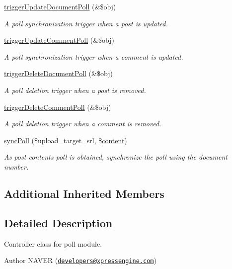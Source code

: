 \begin{DoxyCompactItemize}
\hyperlink{classpollController_a20c5267c985ebf4484a61b238850f0c5}{trigger\+Update\+Document\+Poll} (\&\$obj)
\begin{DoxyCompactList}\small\item\em A poll synchronization trigger when a post is updated. \end{DoxyCompactList}\item 
\hyperlink{classpollController_a2f3da10fbc7dc8bf7dddaf0e81e152ab}{trigger\+Update\+Comment\+Poll} (\&\$obj)
\begin{DoxyCompactList}\small\item\em A poll synchronization trigger when a comment is updated. \end{DoxyCompactList}\item 
\hyperlink{classpollController_ac74ea74fb486787ce4c6c3c9fe3a91da}{trigger\+Delete\+Document\+Poll} (\&\$obj)
\begin{DoxyCompactList}\small\item\em A poll deletion trigger when a post is removed. \end{DoxyCompactList}\item 
\hyperlink{classpollController_abd194582f292d00b57a524453ef256d3}{trigger\+Delete\+Comment\+Poll} (\&\$obj)
\begin{DoxyCompactList}\small\item\em A poll deletion trigger when a comment is removed. \end{DoxyCompactList}\item 
\hyperlink{classpollController_a9a22d9c1e70e7fdf3d635cc4e02fe8f7}{sync\+Poll} (\$upload\+\_\+target\+\_\+srl, \$\hyperlink{classcontent}{content})
\begin{DoxyCompactList}\small\item\em As post content\textquotesingle{}s poll is obtained, synchronize the poll using the document number. \end{DoxyCompactList}\end{DoxyCompactItemize}
\subsection*{Additional Inherited Members}


\subsection{Detailed Description}
Controller class for poll module. 

\begin{DoxyAuthor}{Author}
N\+A\+V\+E\+R (\href{mailto:developers@xpressengine.com}{\tt developers@xpressengine.\+com}) 
\end{DoxyAuthor}


